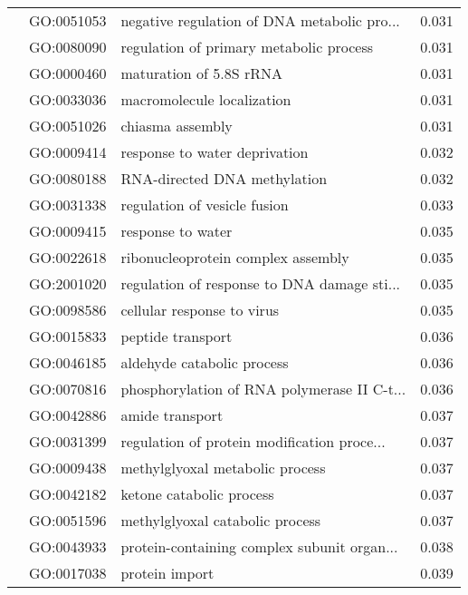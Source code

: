 \begin{longtable}{lllr}
   & GO:0051053 &  negative regulation of DNA metabolic pro... &         0.031 \\
   & GO:0080090 &      regulation of primary metabolic process &         0.031 \\
   & GO:0000460 &                      maturation of 5.8S rRNA &         0.031 \\
   & GO:0033036 &                   macromolecule localization &         0.031 \\
   & GO:0051026 &                             chiasma assembly &         0.031 \\
   & GO:0009414 &                response to water deprivation &         0.032 \\
   & GO:0080188 &                 RNA-directed DNA methylation &         0.032 \\
   & GO:0031338 &                 regulation of vesicle fusion &         0.033 \\
   & GO:0009415 &                            response to water &         0.035 \\
   & GO:0022618 &           ribonucleoprotein complex assembly &         0.035 \\
   & GO:2001020 &  regulation of response to DNA damage sti... &         0.035 \\
   & GO:0098586 &                   cellular response to virus &         0.035 \\
   & GO:0015833 &                            peptide transport &         0.036 \\
   & GO:0046185 &                   aldehyde catabolic process &         0.036 \\
   & GO:0070816 &  phosphorylation of RNA polymerase II C-t... &         0.036 \\
   & GO:0042886 &                              amide transport &         0.037 \\
   & GO:0031399 &  regulation of protein modification proce... &         0.037 \\
   & GO:0009438 &              methylglyoxal metabolic process &         0.037 \\
   & GO:0042182 &                     ketone catabolic process &         0.037 \\
   & GO:0051596 &              methylglyoxal catabolic process &         0.037 \\
   & GO:0043933 &  protein-containing complex subunit organ... &         0.038 \\
   & GO:0017038 &                               protein import &         0.039 \\

\end{longtable}
